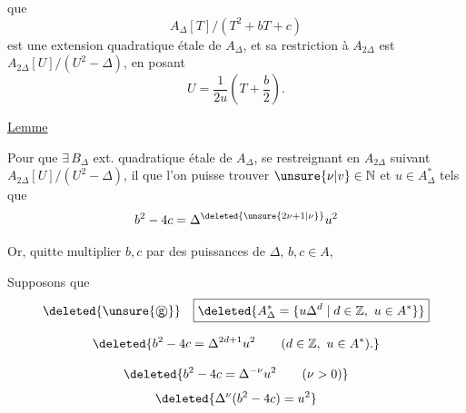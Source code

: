 que
\[
A_{\Delta}[T]/(T^2+bT+c)
\]
est une extension quadratique étale de $A_{\Delta}$, et sa restriction à $A_{2\Delta}$ est  $A_{2\Delta}[U]/(U^2-\Delta)$, en posant
\[
U=\frac{1}{2u}\left(T+\frac b2\right).
\]


\uline{Lemme}  

Pour que $\exists\, B_{\Delta}$ ext. quadratique étale de $A_{\Delta}$, se restreignant en $A_{2\Delta}$ suivant $A_{2\Delta}[U]/(U^2-\Delta)$, il  que l'on puisse trouver  $\unsure{\nu|v}\in\mathbb N$ et \uline{$u\in A_{\Delta}^{*}$} tels que
\[
b^2-4c=\Delta^{\deleted{\unsure{2\nu+1|\nu}}}u^2
\]

Or, quitte  multiplier $b,c$ par des puissances  de $\Delta$,   $b,c\in A$,  

 Supposons que 
\[
\deleted{\unsure{\text{\textcircled{g}}}}\quad\boxed{\deleted{A_{\Delta}^{*}=\{u\Delta^d\mid d\in\mathbb Z,\ u\in A^*\}}}
\]

\[
\deleted{b^2-4c=\Delta^{2d+1}u^2\qquad(d\in\mathbb Z,\ u\in A^*).}
\]

\[
\deleted{b^2-4c=\Delta^{-\nu}u^2\qquad(\nu>0)}
\]
\[
\deleted{\Delta^\nu(b^2-4c)=u^2}
\]
